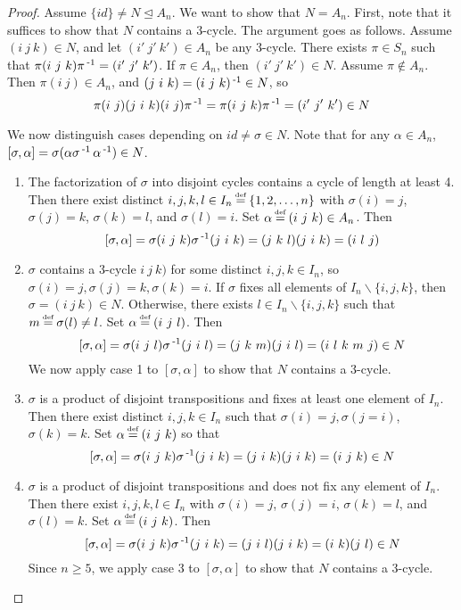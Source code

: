 \documentclass[11pt]{book}
\theoremstyle{definition}   \newtheorem{defn}[counter]{Definition} %
\newcommand{\bs}{\backslash}   \newcommand{\A}{\mathcal{A}}   \newcommand{\sy}{\textnormal{Syl}}   \newcommand{\size}[1]{\left| #1 \right|}
\newcommand{\nsg}{\mathrel{\unlhd}}   \newcommand{\ind}{\parindent24pt}   \newcommand{\vn}{\varnothing}
\newcommand\myeq{\mathrel{\overset{\makebox[0pt]{\mbox{\normalfont\tiny\sffamily \textrm{def}}}}{=}}}
\numberwithin{counter}{chapter}
\begin{document}
\begin{proof}
Assume $\{id\} \ne N \nsg A_n$. We want to show that $N = A_n$. First, note that it suffices to show that $N$ contains a 3-cycle. The argument goes as follows. Assume $(i \ j \ k) \in N$, and let $(i'\ j'\ k') \in A_n$ be any 3-cycle. There exists $\pi \in S_n$ such that $\pi(i\ j\ k) \pi\inv = (i'\ j'\ k')$. If $\pi \in A_n$, then $(i'\ j'\ k') \in N$. Assume $\pi \notin A_n$. Then $\pi (i\ j) \in A_n$, and $(j\ i\ k) = (i\ j\ k)\operatorname{^{-1}} \in N$, so
	\[\pi(i\ j) (j\ i\ k) (i\ j) \pi\operatorname{^{-1}} = \pi (i\ j\ k) \pi\operatorname{^{-1}} = (i'\ j'\ k') \in N \]

We now distinguish cases depending on $id \ne \sigma \in N$. Note that for any $\alpha \in A_n$, $[\sigma,\alpha] = \sigma (\alpha \sigma\operatorname{^{-1}} \alpha\operatorname{^{-1}}) \in N$.

\begin{enumerate}
\item[\tb{Case 1.}] The factorization of $\sigma$ into disjoint cycles contains a cycle of length at least 4. Then there exist distinct $i,j,k,l \in I_n \myeq \{1,2,\dots,n\}$ with $\sigma(i)=j$, $\sigma(j)=k$, $\sigma(k)=l$, and $\sigma(l)=i$. Set $\alpha \myeq (i\ j\ k) \in A_n$. Then
	\[ [\sigma,\alpha] = \sigma (i\ j\ k) \sigma\inv (j\ i\ k) = (j\ k\ l)(j\ i\ k) = (i\ l\ j) \]

\item[\tb{Case 2.}] $\sigma$ contains a 3-cycle $i\ j\ k)$ for some distinct $i,j,k \in I_n$, so $\sigma(i) = j, \sigma(j)=k, \sigma(k)=i$. If $\sigma$ fixes all elements of $I_n\bs \{i,j,k\}$, then $\sigma = (i\ j\ k) \in N$. Otherwise, there exists $l \in I_n\bs \{i,j,k\}$ such that $m \myeq \sigma(l) \ne l$. Set $\alpha \myeq (i\ j\ l)$. Then
	\[ [\sigma,\alpha] = \sigma (i\ j\ l) \sigma\inv (j\ i\ l) = (j\ k\ m)(j\ i\ l) = (i\ l\ k\ m\ j) \in N \]
We now apply case 1 to $[\sigma,\alpha]$ to show that $N$ contains a 3-cycle.

\item[\tb{Case 3.}] $\sigma$ is a product of disjoint transpositions and fixes at least one element of $I_n$. Then there exist distinct $i,j,k \in I_n$ such that $\sigma(i) = j, \sigma(j=i)$, $\sigma(k)=k$. Set $\alpha \myeq (i\ j\ k)$ so that
	\[[\sigma,\alpha] = \sigma(i\ j\ k)\sigma\inv (j\ i\ k) = (j\ i\ k)(j\ i\ k) = (i\ j\ k) \in N \]

\item[\tb{Case 4.}] $\sigma$ is a product of disjoint transpositions and does not fix any element of $I_n$. Then there exist $i,j,k,l \in I_n$ with $\sigma(i)=j$, $\sigma(j) = i$, $\sigma(k)=l$, and $\sigma(l)=k$. Set $\alpha \myeq (i\ j\ k)$. Then
	\[[\sigma,\alpha] = \sigma(i\ j\ k)\sigma\inv(j\ i\ k) = (j\ i\ l)(j\ i\ k) = (i\ k)(j\ l) \in N \]
Since $n \geq 5$, we apply case 3 to $[\sigma,\alpha]$ to show that $N$ contains a 3-cycle.
\end{enumerate}
\end{proof}
\end{document}
